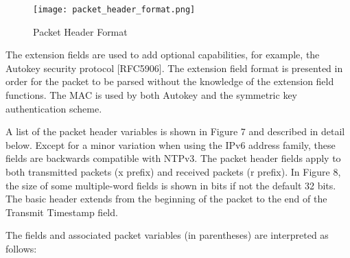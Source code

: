 \begin{figure}
\centering
\texttt{[image: packet\_header\_format.png]}
\caption{Packet Header Format}
\label{packet_header_format}
\end{figure}

The extension fields are used to add optional capabilities, for
example, the Autokey security protocol [RFC5906]. The extension
field format is presented in order for the packet to be parsed
without the knowledge of the extension field functions. The MAC is
used by both Autokey and the symmetric key authentication scheme.

A list of the packet header variables is shown in Figure 7 and
described in detail below. Except for a minor variation when using
the IPv6 address family, these fields are backwards compatible with
NTPv3. The packet header fields apply to both transmitted packets (x
prefix) and received packets (r prefix). In Figure 8, the size of
some multiple-word fields is shown in bits if not the default 32
bits. The basic header extends from the beginning of the packet to
the end of the Transmit Timestamp field.

The fields and associated packet variables (in parentheses) are
interpreted as follows:


